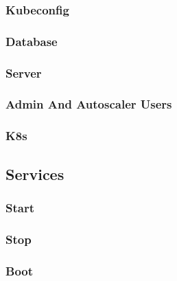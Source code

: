 \subsubsection{Kubeconfig}
\label{subsubsec:implementation_installer_cluster_initialization_kubeconfig}

\subsubsection{Database}
\label{subsubsec:implementation_installer_cluster_initialization_database}

\subsubsection{Server}
\label{subsubsec:implementation_installer_cluster_initialization_server}

\subsubsection{Admin And Autoscaler Users}
\label{subsubsec:implementation_installer_cluster_initialization_admin_and_autoscaler_users}

\subsubsection{K8s}
\label{subsubsec:implementation_installer_cluster_initialization_k8s}

\subsection{Services}
\label{subsec:implementation_installer_services}

\subsubsection{Start}
\label{subsubsec:implementation_installer_services_start}

\subsubsection{Stop}
\label{subsubsec:implementation_installer_services_stop}

\subsubsection{Boot}
\label{subsubsec:implementation_installer_services_boot}

